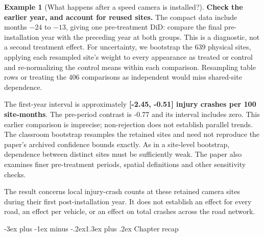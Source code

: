 \documentclass[
  11pt,
]{book}
\makeatletter
\renewcommand\section{\@startsection{section}{1}{\z@}
  {-3ex plus -1ex minus -.2ex}{1.3ex plus .2ex}
  {\normalfont\Large\bfseries\color{TextbookInk}}}
\theoremstyle{definition}
\theoremstyle{definition}
\newtheorem{example}{Example}[chapter]
\theoremstyle{definition}
\theoremstyle{definition}
\theoremstyle{remark}
\makeatother
\begin{document}
\begin{example}[What happens after a speed camera is installed?]
\textbf{Check the earlier year, and account for reused sites.} The compact data include months \(-24\) to \(-13\), giving one pre-treatment DiD: compare the final pre-installation year with the preceding year at both groups. This is a diagnostic, not a second treatment effect. For uncertainty, we bootstrap the 639 physical sites, applying each resampled site's weight to every appearance as treated or control and re-normalizing the control means within each comparison. Resampling table rows or treating the 406 comparisons as independent would miss shared-site dependence.

\begin{table}[H]
\centering\begingroup\fontsize{10}{12}\selectfont

\endgroup{}
\end{table}

The first-year interval is approximately \textbf{{[}-2.45, -0.51{]} injury crashes per 100 site-months}. The pre-period contrast is -0.77 and its interval includes zero. This earlier comparison is imprecise; non-rejection does not establish parallel trends. The classroom bootstrap resamples the retained sites and need not reproduce the paper's archived confidence bounds exactly. As in a site-level bootstrap, dependence between distinct sites must be sufficiently weak. The paper also examines finer pre-treatment periods, spatial definitions and other sensitivity checks.

The result concerns local injury-crash counts at these retained camera sites during their first post-installation year. It does not establish an effect for every road, an effect per vehicle, or an effect on total crashes across the road network.
\end{example}


\section{Chapter recap}\label{panel-recap}
\end{document}
